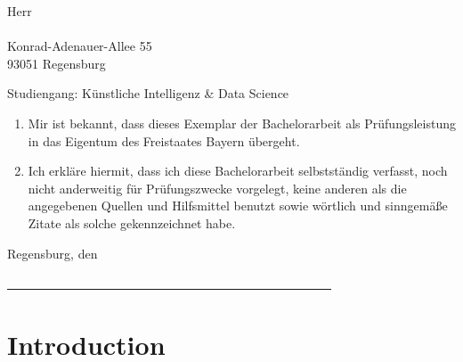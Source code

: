 \documentclass[12pt, a4paper, headinclude, twoside, plainheadsepline, open=right, numbers=noenddot, hidelinks, toc=listof, toc=bibliography]{scrreprt}
\begin{document}
\noindent
Herr\\
\@author\\
Konrad-Adenauer-Allee 55\\
93051 Regensburg\\
\smallskip

\noindent
Studiengang: Künstliche Intelligenz \& Data Science
\bigskip

\begin{enumerate}
\item Mir ist bekannt, dass dieses Exemplar der Bachelorarbeit als Prüfungsleistung in das Eigentum des Freistaates Bayern übergeht.
\item Ich erkläre hiermit, dass ich diese Bachelorarbeit selbstständig verfasst, noch nicht anderweitig für Prüfungszwecke vorgelegt, keine anderen als die angegebenen Quellen und Hilfsmittel benutzt sowie wörtlich und sinngemäße Zitate als solche gekennzeichnet habe.
\end{enumerate}
\vspace{1cm}
Regensburg, den \@date\\
\medskip
\medskip

\noindent
\underline{~~~~~~~~~~~~~~~~~~~~~~~~~~~~~~~~~~~~~~~~~~~~~~~~~~~~}\\
\@author

\makeatother



\cleardoublepage
{}

\tableofcontents 										%




\pagestyle{scrheadings} 																%
\cleardoublepage
{} 																	%




\chapter{Introduction}
\label{chap:intro}
\end{document}

